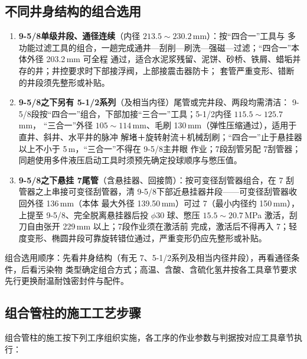 \subsection{不同井身结构的组合选用}

\begin{enumerate}[label=(\arabic*),leftmargin=2em,itemsep=2pt]
	\item \textbf{9-5/8\inch 单级井段、通径连续}（内径 $213.5\sim230.2$\,mm）：按“四合一”工具与
	多功能过滤工具的组合，一趟完成通井—刮削—刷洗—强磁—过滤；“四合一”本体外径 203.2\,mm 可全程
	通过，适合水泥浆残留、泥饼、砂桥、铁屑、蜡垢并存的井；井控要求时下部接浮阀，上部接震击器防卡；
	套管严重变形、错断的井段须先整形或补贴。
	\item \textbf{9-5/8\inch 之下另有 5-1/2\inch 系列}（及相当内径）尾管或完井段、两段均需清洁：
	9-5/8\inch 段按“四合一”组合，下部加接“三合一”工具；5-1/2\inch 内径 $115.5\sim125.7$\,mm，
	“三合一”外径 $105\sim114$\,mm、毛刷 130\,mm（弹性压缩通过），适用于直井、斜井、水平井的脉冲
	解堵＋旋转射流＋机械刮刷；“四合一”止于悬挂器以上不小于 5\,m，“三合一”不得在 9-5/8\inch 主井眼
	作业；7\inch 段刮管另配 7\inch 刮管器；同趟使用多件液压启动工具时须预先确定投球顺序与憋压值。
	\item \textbf{9-5/8\inch 之下悬挂 7\inch 尾管}（含悬挂器、回接筒）：按可变径刮管器组合，在 7\inch
	刮管器之上串接可变径刮管器，清 9-5/8\inch 下部近悬挂器井段——可变径刮管器收回外径 136\,mm（本体
	最大外径 139.50\,mm）可过 7\inch（最小内径约 150\,mm），上提至 9-5/8\inch、完全脱离悬挂器后投
	$\phi 30$ 球、憋压 $15.5\sim20.7$\,MPa 激活，刮刀自由张开 229\,mm 以上；7\inch 段作业须在激活前
	完成，激活后不得再入 7\inch；轻度变形、椭圆井段可靠旋转错位通过，严重变形仍应先整形或补贴。
\end{enumerate}

组合选用顺序：先看井身结构（有无 7\inch、5-1/2\inch 系列及相当内径井段），再看通径条件，后看污染物
类型确定组合方式；高温、含酸、含硫化氢井按各工具章节要求先行更换耐温耐蚀密封件与配件。

\subsection{组合管柱的施工工艺步骤}

组合管柱的施工按下列工序组织实施，各工序的作业参数与判据按对应工具章节执行：

